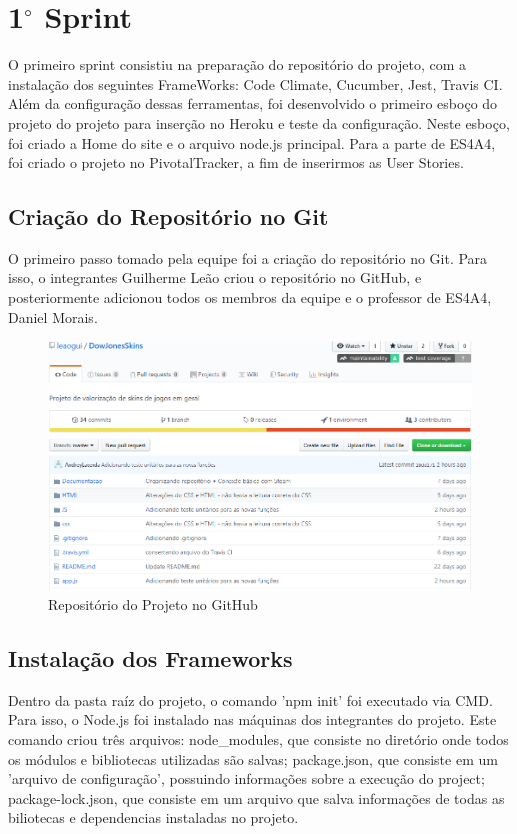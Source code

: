 \section{1$^{\circ}$ Sprint}
O primeiro sprint consistiu na preparação do repositório do projeto, com a instalação dos seguintes
FrameWorks: Code Climate, Cucumber, Jest, Travis CI. Além da configuração dessas ferramentas,
foi desenvolvido o primeiro esboço do projeto do projeto para inserção no Heroku e teste da configuração.
Neste esboço, foi criado a Home do site e o arquivo node.js principal. Para a parte de ES4A4,
foi criado o projeto no PivotalTracker, a fim de inserirmos as User Stories.

\subsection{Criação do Repositório no Git}
O primeiro passo tomado pela equipe foi a criação do repositório no Git. Para isso, o integrantes
Guilherme Leão criou o repositório no GitHub, e posteriormente adicionou todos os membros
da equipe e o professor de ES4A4, Daniel Morais.\\
\begin{figure}[!htb]
	\centering
	\includegraphics[scale=0.6]{Imagens/Repositorio.png}
	\caption{Repositório do Projeto no GitHub}
\end{figure}

\subsection{Instalação dos Frameworks}
Dentro da pasta raíz do projeto, o comando 'npm init' foi executado via CMD. Para isso, o Node.js foi instalado
nas máquinas dos integrantes do projeto. Este comando criou três arquivos: node\_modules, que consiste no diretório onde todos
os módulos e bibliotecas utilizadas são salvas; package.json, que consiste em um 'arquivo de configuração',
possuindo informações sobre a execução do project; package-lock.json, que consiste em um arquivo que salva
informações de todas as biliotecas e dependencias instaladas no projeto.

